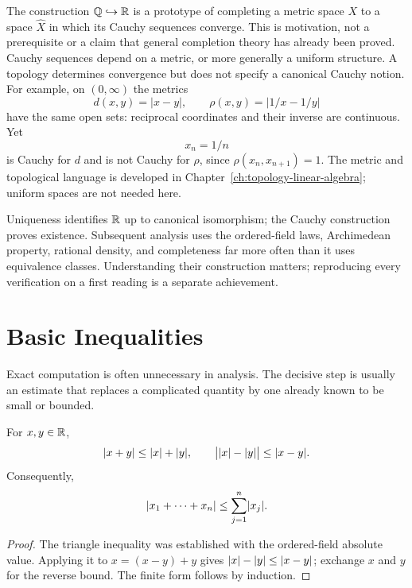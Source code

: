 \begin{remark}\label{rem:why-cauchy}
The construction $\mathbb{Q}\hookrightarrow\mathbb{R}$ is a prototype of completing a
metric space $X$ to a space $\widehat X$ in which its Cauchy sequences
converge. This is motivation, not a prerequisite or a claim that general
completion theory has already been proved. Cauchy sequences depend on a
metric, or more generally a uniform structure. A topology determines
convergence but does not specify a canonical Cauchy notion.
For example, on $(0,\infty)$ the metrics
\[
d(x,y)=|x-y|,\qquad \rho(x,y)=|1/x-1/y|
\]
have the same open sets: reciprocal coordinates and their inverse are
continuous. Yet
\[
x_n=1/n
\]
 is Cauchy for $d$ and is not Cauchy for $\rho$,
since $\rho(x_n,x_{n+1})=1$. The metric and topological language is
developed in Chapter~\ref{ch:topology-linear-algebra}; uniform spaces
are not needed here.
\end{remark}


\begin{remark}
Uniqueness identifies $\mathbb{R}$ up to canonical isomorphism; the Cauchy
construction proves existence. Subsequent analysis uses the ordered-field
laws, Archimedean property, rational density, and completeness far more often
than it uses equivalence classes. Understanding their construction matters;
reproducing every verification on a first reading is a separate achievement.
\end{remark}
\section{Basic Inequalities}

Exact computation is often unnecessary in analysis.  The decisive step is
usually an estimate that replaces a complicated quantity by one already
known to be small or bounded.

\begin{proposition}
For $x,y\in\mathbb{R}$,
\[
\lvert x+y\rvert\leq\lvert x\rvert+\lvert y\rvert,
\qquad
\bigl\lvert\lvert x\rvert-\lvert y\rvert\bigr\rvert\leq\lvert x-y\rvert.
\]
Consequently,
\[
\lvert x_1+\cdots+x_n\rvert\leq\sum_{j=1}^n\lvert x_j\rvert.
\]

\end{proposition}
\begin{proof}
The triangle inequality was established with the ordered-field absolute
value.  Applying it to $x=(x-y)+y$ gives
$\lvert x\rvert-\lvert y\rvert\leq\lvert x-y\rvert$; exchange $x$ and $y$ for the reverse
bound.  The finite form follows by induction.
\end{proof}


